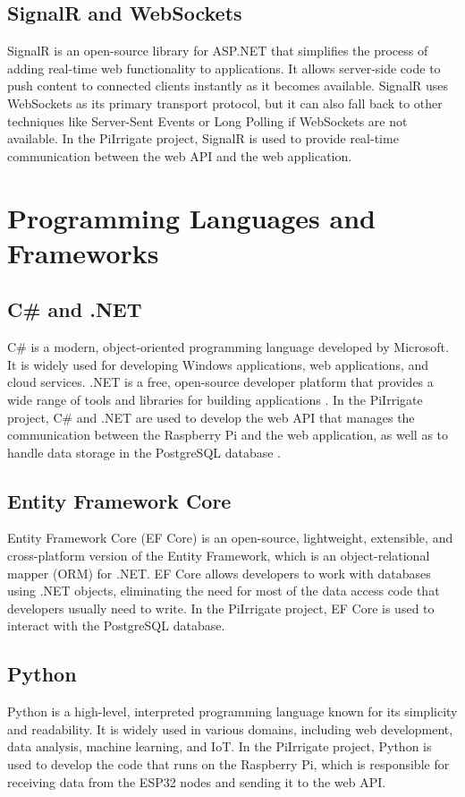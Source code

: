 \subsection{SignalR and WebSockets}
SignalR is an open-source library for ASP.NET that simplifies 
the process of adding real-time web functionality to applications.
It allows server-side code to push content to connected clients instantly as it becomes available.
SignalR uses WebSockets as its primary transport protocol, but it can also fall back to other techniques like
Server-Sent Events or Long Polling if WebSockets are not available\cite{signalrandwebsockets}.
In the PiIrrigate project, SignalR is used to provide real-time communication 
between the web API and the web application.

\section{Programming Languages and Frameworks}
\subsection{C\# and .NET}
C\# is a modern, object-oriented programming language developed by Microsoft.
It is widely used for developing Windows applications, web applications, and cloud services.
.NET is a free, open-source developer platform that provides a wide range of tools and libraries 
for building applications \cite{csharp}.
In the PiIrrigate project, C\# and .NET are used to develop the web API that manages the communication
between the Raspberry Pi and the web application, as well as to handle data storage in the PostgreSQL database
\cite{dotnet}.

\subsection{Entity Framework Core}
Entity Framework Core (EF Core) is an open-source, lightweight, extensible, and cross-platform version 
of the Entity Framework, which is an object-relational mapper (ORM) for .NET.
EF Core allows developers to work with databases using .NET objects, eliminating the need for 
most of the data access code that developers usually need to write\cite{efcore}.
In the PiIrrigate project, EF Core is used to interact with the PostgreSQL database.

\subsection{Python}
Python is a high-level, interpreted programming language known for its simplicity and readability.
It is widely used in various domains, including web development, data analysis, machine learning, and IoT\cite{python}.
In the PiIrrigate project, Python is used to develop the code that runs on the Raspberry Pi,
which is responsible for receiving data from the ESP32 nodes and sending it to the web API.

